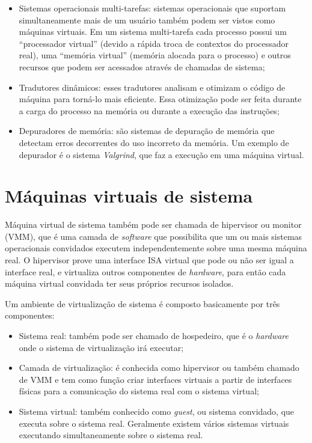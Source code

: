 \begin{itemize}
 \item Sistemas operacionais multi-tarefas: sistemas operacionais que suportam simultaneamente mais de um usuário também podem ser
 vistos como máquinas virtuais. Em um sistema multi-tarefa cada processo possui um ``processador virtual'' (devido a rápida troca de 
 contextos do processador real), uma ``memória virtual'' (memória alocada para o processo) e outros recursos que podem ser acessados
 através de chamadas de sistema;
 \item Tradutores dinâmicos: esses tradutores analisam e otimizam o código de máquina para torná-lo mais eficiente. Essa otimização 
 pode ser feita durante a carga do processo na memória ou durante a execução das instruções;
 \item Depuradores de memória: são sistemas de depuração de memória que detectam erros decorrentes do uso incorreto da memória.
 Um exemplo de depurador é o sistema \textit{Valgrind}, que faz a execução em uma máquina virtual.
\end{itemize}

\section{Máquinas virtuais de sistema}
\label{section:virtsistema}

Máquina virtual de sistema também pode ser chamada de hipervisor ou monitor (\ac{VMM}), que é uma camada de \textit{software} que possibilita
que um ou mais sistemas operacionais convidados executem independentemente sobre uma mesma máquina real. O hipervisor prove uma interface
\ac{ISA} virtual que pode ou não ser igual a interface real, e virtualiza outros componentes de \textit{hardware}, para então cada máquina
virtual convidada ter seus próprios recursos isolados.

Um ambiente de virtualização de sistema é composto basicamente por três componentes:
\begin{itemize}
 \item Sistema real: também pode ser chamado de hospedeiro, que é o \textit{hardware} onde o sistema de virtualização irá executar;
 \item Camada de virtualização: é conhecida como hipervisor ou também chamado de \ac{VMM} e tem como função criar interfaces virtuais a
 partir de interfaces físicas para a comunicação do sistema real com o sistema virtual;
 \item Sistema virtual: também conhecido como \textit{guest}, ou sistema convidado, que executa sobre o sistema real. Geralmente
 existem vários sistemas virtuais executando simultaneamente sobre o sistema real.
\end{itemize}

